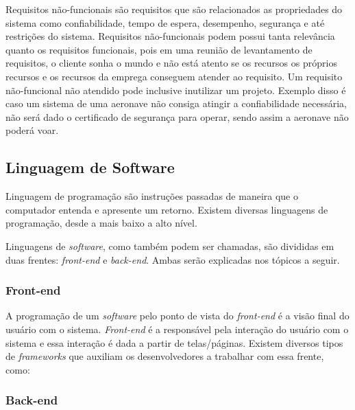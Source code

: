 Requisitos não-funcionais são requisitos que são relacionados as propriedades do sistema como confiabilidade, tempo de espera, desempenho, segurança e até restrições do sistema. Requisitos não-funcionais podem possui tanta relevância quanto os requisitos funcionais, pois em uma reunião de levantamento de requisitos, o cliente sonha o mundo e não está atento se os recursos os próprios recursos e os recursos da emprega conseguem atender ao requisito. Um requisito não-funcional não atendido pode inclusive inutilizar um projeto. Exemplo disso é caso um sistema de uma aeronave não consiga atingir a confiabilidade necessária, não será dado o certificado de segurança para operar, sendo assim a aeronave não poderá voar.

\subsection{Linguagem de Software}

Linguagem de programação são instruções passadas de maneira que o computador entenda e apresente um retorno. Existem diversas linguagens de programação, desde a mais baixo a alto nível.

Linguagens de \textit{software}, como também podem ser chamadas, são divididas em duas frentes: \textit{front-end} e \textit{back-end}. Ambas serão explicadas nos tópicos a seguir.

\subsubsection{Front-end}
\label{sec:front-end}

A programação de um \textit{software} pelo ponto de vista do \textit{front-end} é a visão final do usuário com o sistema. \textit{Front-end} é a responsável pela interação do usuário com o sistema e essa interação é dada a partir de telas/páginas. Existem diversos tipos de \textit{frameworks} que auxiliam os desenvolvedores a trabalhar com essa frente, como:


\subsubsection{Back-end}
\label{sec:back-end}

